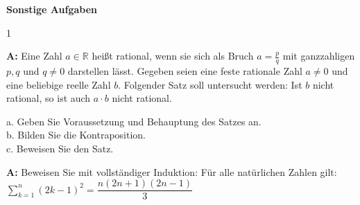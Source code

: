 \documentclass[landscape,twocolumn,a4paper]{article}
\begin{document}
\newpage
\textbf{Sonstige Aufgaben}
\bigskip

\setcounter {y} {1}


\textbf{A:}
Eine Zahl $a \in \mathbb{R}$ heißt rational, wenn sie sich als Bruch $a = \frac{p}{q}$ mit ganzzahligen $p, q$ und 
$q \neq 0$ darstellen lässt. Gegeben seien eine feste rationale Zahl $a \neq 0$ und eine beliebige reelle Zahl $b$. Folgender Satz soll untersucht werden: Ist $b$ nicht rational, so ist auch $a \cdot b$ nicht rational.

a. Geben Sie Voraussetzung und Behauptung des Satzes an. \\
b. Bilden Sie die Kontraposition. \\
c. Beweisen Sie den Satz.
\bigskip {}

\textbf{A:}
Beweisen Sie mit vollständiger Induktion: Für alle natürlichen Zahlen gilt: \\

$\sum\limits_{k=1}^n (2k-1)^2 = \dfrac{n(2n+1)(2n-1)}{3}$
\bigskip {}
\end{document}

